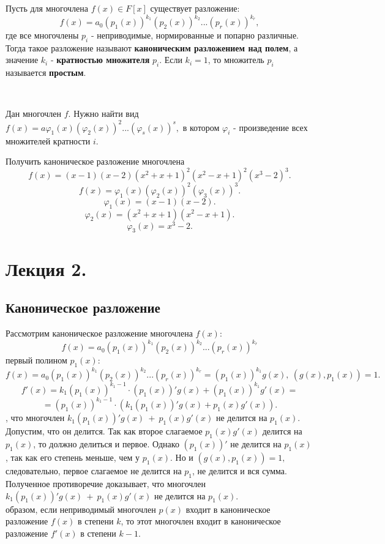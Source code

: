 \documentclass[12pt]{article}
\begin{document}
\begin{defn}
Пусть для многочлена $f(x) \in F[x]$ существует разложение: $$f(x) = a_0(p_1(x))^{k_1}(p_2(x))^{k_2}...(p_r(x))^{k_r},$$ где все многочлены $p_i$ - неприводимые, нормированные и попарно различные. Тогда такое разложение называют \textbf{каноническим разложением над полем}, а значение $k_i$ - \textbf{кратностью множителя} $p_i$. Если $k_i = 1$, то множитель $p_i$ называется \textbf{простым}.
\end{defn}

~\
\begin{task*}
Дан многочлен $f$. Нужно найти вид $f(x) = a\varphi_1(x)(\varphi_2(x))^2...(\varphi_s(x))^s,$ в котором $\varphi_i$ - произведение всех множителей кратности $i$.
\end{task*}

\begin{examp}
Получить каноническое разложение многочлена $$f(x) = (x - 1)(x - 2)(x^2 + x + 1)^2(x^2 - x + 1)^2(x^3 - 2)^3.$$
$$f(x) = \varphi_1(x)(\varphi_2(x))^2(\varphi_3(x))^3.$$
$$\varphi_1(x) = (x - 1)(x - 2).$$
$$\varphi_2(x) = (x^2 + x + 1)(x^2 - x + 1).$$
$$\varphi_3(x) = x^3 - 2.$$
\end{examp}

\section{Лекция 2.}
\subsection{Каноническое разложение}
\hspace{0.6cm}Рассмотрим каноническое разложение многочлена $f(x)$:
$$f(x) = a_0(p_1(x))^{k_1}(p_2(x))^{k_2}...(p_r(x))^{k_r}$$
 первый полином $p_1(x)$:
$$f(x) = a_0(p_1(x))^{k_1}(p_2(x))^{k_2}...(p_r(x))^{k_r} = (p_1(x))^{k_1}g(x),~(g(x), p_1(x)) = 1.$$
$$f'(x) = k_1(p_1(x))^{k_1 - 1} \cdot (p_1(x))'g(x) + (p_1(x))^{k_1}g'(x) =$$
$$ = (p_1(x))^{k_1 - 1} \cdot (k_1(p_1(x))'g(x) + p_1(x)g'(x)).$$
\indentДокажем, что многочлен $k_1(p_1(x))'g(x)~+~p_1(x)g'(x)$ не делится на $p_1(x)$. Допустим, что он делится. Так как второе слагаемое $p_1(x)g'(x)$ делится на $p_1(x)$, то должно делиться и первое. Однако $(p_1(x))'$ не делится на $p_1(x)$, так как его степень меньше, чем у $p_1(x)$. Но и $(g(x), p_1(x)) = 1,$ следовательно, первое слагаемое не делится на $p_1$, не делится и вся сумма. Полученное противоречие доказывает, что многочлен $k_1(p_1(x))'g(x)~+~p_1(x)g'(x)$ не делится на $p_1(x)$.
\\
 образом, если неприводимый многочлен $p(x)$ входит в каноническое разложение $f(x)$ в степени $k$,  то этот многочлен входит в каноническое
разложение $f'(x)$ в степени $k - 1$.
\end{document}

